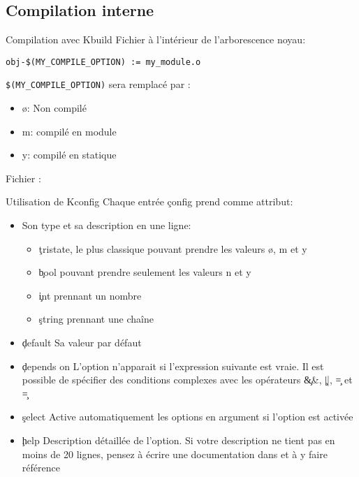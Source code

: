 \subsection{Compilation interne}

\begin{frame}[fragile=singleslide]{Compilation avec Kbuild}
  Fichier  à l'intérieur de l'arborescence noyau:
  \begin{lstlisting}
obj-$(MY_COMPILE_OPTION) := my_module.o  
  \end{lstlisting} %
  \lstinline+$(MY_COMPILE_OPTION)+ sera remplacé par :
  \begin{itemize}
  \item ø: Non compilé
  \item m: compilé en module
  \item y: compilé en statique
  \end{itemize}
  Fichier :
  
\end{frame} 

\begin{frame}[fragile=singleslide]{Utilisation de Kconfig}
  Chaque entrée \c{config} prend comme attribut:
  \begin{itemize} 
  \item Son type et sa description en une ligne:
    \begin{itemize}
    \item \c{tristate}, le plus  classique pouvant prendre les valeurs
     ø, m et y
    \item \c{bool} pouvant prendre seulement les valeurs n et y
    \item \c{int} prennant un nombre
    \item \c{string} prennant une chaîne
    \end{itemize} 
  \item \c{default} Sa valeur par défaut
  \item  \c{depends on} L'option  n'apparait si  l'expression suivante
    est vraie.  Il est possible de spécifier  des conditions complexes
    avec les opérateurs \c{&&}, \c{||}, \c{=} et \c{\!=}
  \item \c{select}  Active automatiquement les options  en argument si
    l'option est activée
  \item   \c{help}  Description   détaillée  de   l'option.   Si  votre
    description ne  tient pas en moins  de 20 lignes,  pensez à écrire
    une documentation dans  et à y faire référence
  \end{itemize} 
\end{frame}

